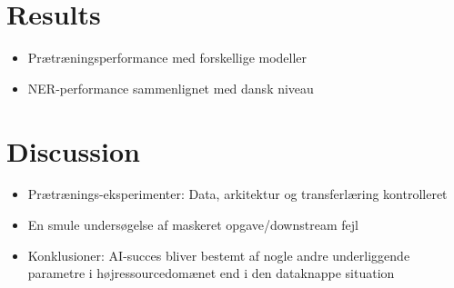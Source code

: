 \documentclass[12pt, fleqn]{article}
\begin{document}
\section{Results}%
\label{sec:Results}
\begin{itemize}
    \item Prætræningsperformance med forskellige modeller
    \item NER-performance sammenlignet med dansk niveau
\end{itemize}

\section{Discussion}%
\label{sec:Discussion}
\begin{itemize}
    \item Prætrænings-eksperimenter: Data, arkitektur og transferlæring kontrolleret
    \item En smule undersøgelse af maskeret opgave/downstream fejl
    \item Konklusioner: AI-succes bliver bestemt af nogle andre underliggende parametre i højressourcedomænet end i den dataknappe situation
\end{itemize}

\renewcommand*{\bibfont}{\normalfont\footnotesize}
\printbibliography[heading=bibintoc]

\appendix

\end{document}
